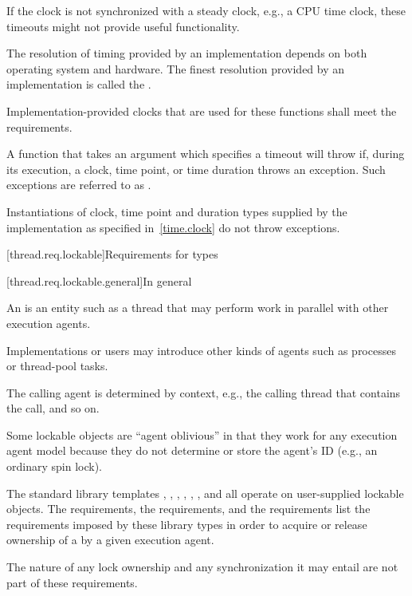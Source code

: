 \pnum
\begin{note} If the clock is not synchronized with a steady clock, e.g., a CPU time clock, these
timeouts might not provide useful functionality. \end{note}

\pnum
The resolution of timing provided by an implementation depends on both operating system
and hardware. The finest resolution provided by an implementation is called the
.

\pnum
Implementation-provided clocks that are used for these functions shall meet the
 requirements.

\pnum
A function that takes an argument which specifies a timeout will throw if,
during its execution, a clock, time point, or time duration throws an exception.
Such exceptions are referred to as .
\begin{note} Instantiations of clock, time point and duration types supplied by
the implementation as specified in~\ref{time.clock} do not throw exceptions.
\end{note}

[thread.req.lockable]{Requirements for  types}

[thread.req.lockable.general]{In general}

\pnum
An  is an entity such as a thread that may perform work in parallel with
other execution agents. \begin{note} Implementations or users may introduce other kinds of
agents such as processes or thread-pool tasks. \end{note} The calling agent is determined by
context, e.g., the calling thread that contains the call, and so on.

\pnum
\begin{note} Some lockable objects are ``agent oblivious'' in that they work for any
execution agent model because they do not determine or store the agent's ID (e.g., an
ordinary spin lock). \end{note}

\pnum
The standard library templates ,
,
,
, ,
, and
 all operate on user-supplied
lockable objects. The  requirements, the  requirements,
and the  requirements list the requirements imposed by these library types
in order to acquire or release ownership of a  by a given execution agent.
\begin{note} The nature of any lock ownership and any synchronization it may entail are not part
of these requirements. \end{note}

